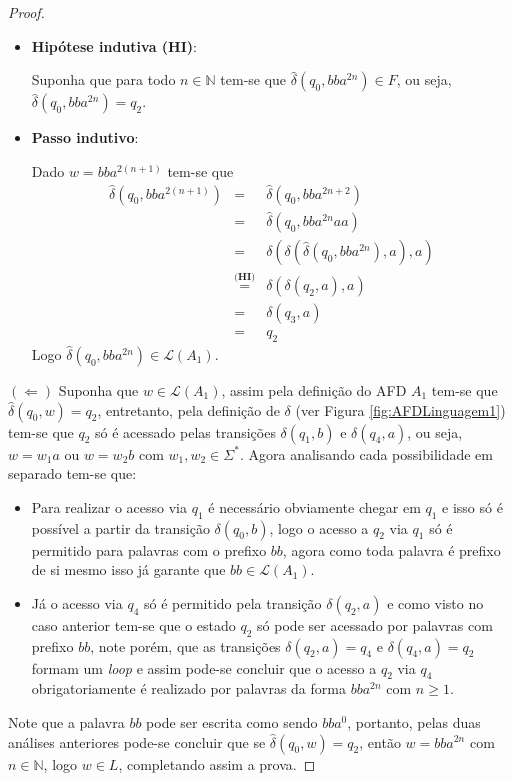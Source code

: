 \begin{example}
\begin{proof}
\begin{itemize}
			\item \textbf{Hipótese indutiva (HI)}:
			
			Suponha que para todo $n \in \mathbb{N}$ tem-se que $\widehat{\delta}(q_0, bba^{2n}) \in F$, ou seja, $\widehat{\delta}(q_0, bba^{2n}) = q_2$.
			
			\item \textbf{Passo indutivo}:
			
			Dado $w = bba^{2(n+1)}$ tem-se que
			\begin{eqnarray*}
				\widehat{\delta}(q_0, bba^{2(n+1)}) & = & \widehat{\delta}(q_0, bba^{2n + 2})\\
				& = & \widehat{\delta}(q_0, bba^{2n}aa)\\
				& = & \delta(\delta(\widehat{\delta}(q_0, bba^{2n}), a), a)\\
				& \stackrel{\textbf{(HI)}}{=} & \delta(\delta(q_2, a), a)\\
				& = & \delta(q_3, a)\\
				& = & q_2
			\end{eqnarray*} 
			Logo $\widehat{\delta}(q_0, bba^{2n}) \in \mathcal{L}(A_1)$.
		\end{itemize} 
		$(\Leftarrow)$ Suponha que $w \in \mathcal{L}(A_1)$, assim pela definição do AFD $A_1$ tem-se que $\widehat{\delta}(q_0, w) = q_2$, entretanto, pela definição de $\delta$ (ver Figura \ref{fig:AFDLinguagem1}) tem-se que $q_2$ só é acessado pelas transições $\delta(q_1, b)$ e $\delta(q_4, a)$, ou seja, $w = w_1a$ ou $w = w_2b$ com $w_1, w_2 \in \Sigma^*$. Agora analisando cada possibilidade em separado tem-se que: 
		\begin{itemize}
			\item Para realizar o acesso via $q_1$ é necessário obviamente chegar em $q_1$ e isso só é possível a partir da transição $\delta(q_0, b)$, logo o acesso a $q_2$ via $q_1$ só é permitido para palavras com o prefixo $bb$, agora como toda palavra é prefixo de si mesmo isso já garante que $bb \in \mathcal{L}(A_1)$.
			\item Já o acesso via $q_4$ só é permitido pela transição $\delta(q_2, a)$ e como visto no caso anterior tem-se que o estado $q_2$ só pode ser acessado por palavras com prefixo $bb$, note porém, que as transições $\delta(q_2, a) = q_4$ e $\delta(q_4, a) = q_2$ formam um \textit{loop} e assim pode-se concluir que o acesso a $q_2$ via $q_4$ obrigatoriamente é realizado por palavras da forma $bba^{2n}$ com $n \geq 1$.
		\end{itemize}
		Note que a palavra $bb$ pode ser escrita como sendo $bba^0$, portanto, pelas duas análises anteriores pode-se concluir que se $\widehat{\delta}(q_0, w) = q_2$, então $w = bba^{2n}$ com $n \in \mathbb{N}$, logo $w \in L$, completando assim a prova. 
	\end{proof}
\end{example}

